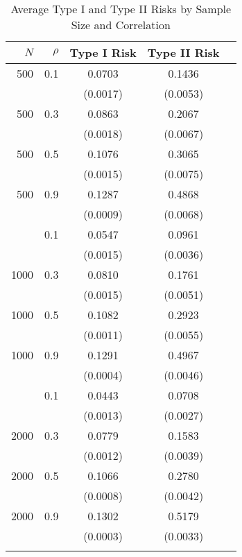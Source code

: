 \begin{table}
\caption{Average Type I and Type II Risks by Sample Size and Correlation}
\centering
\begin{tabular}{rrccc}
\toprule
$N$ & $\rho$ & \multicolumn{1}{c}{Type I Risk} & \multicolumn{1}{c}{Type II Risk} \\
\midrule
500 & 0.1 & 0.0703 & 0.1436 \\
& & (0.0017) & (0.0053) \\
500 & 0.3 & 0.0863 & 0.2067 \\
& & (0.0018) & (0.0067) \\
500 & 0.5 & 0.1076 & 0.3065 \\
& & (0.0015) & (0.0075) \\
500 & 0.9 & 0.1287 & 0.4868 \\
& & (0.0009) & (0.0068) \\
\addlinespace
1000 & 0.1 & 0.0547 & 0.0961 \\
& & (0.0015) & (0.0036) \\
1000 & 0.3 & 0.0810 & 0.1761 \\
& & (0.0015) & (0.0051) \\
1000 & 0.5 & 0.1082 & 0.2923 \\
& & (0.0011) & (0.0055) \\
1000 & 0.9 & 0.1291 & 0.4967 \\
& & (0.0004) & (0.0046) \\
\addlinespace
2000 & 0.1 & 0.0443 & 0.0708 \\
& & (0.0013) & (0.0027) \\
2000 & 0.3 & 0.0779 & 0.1583 \\
& & (0.0012) & (0.0039) \\
2000 & 0.5 & 0.1066 & 0.2780 \\
& & (0.0008) & (0.0042) \\
2000 & 0.9 & 0.1302 & 0.5179 \\
& & (0.0003) & (0.0033) \\
\addlinespace
\bottomrule
\end{tabular}
\end{table}
